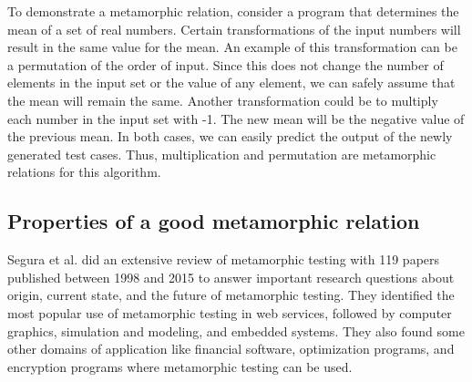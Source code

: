 To demonstrate a metamorphic relation, consider a program that determines the mean of a set of real numbers. Certain transformations of the input numbers will result in the same value for the mean. An example of this transformation can be a permutation of the order of input. Since this does not change the number of elements in the input set or the value of any element, we can safely assume that the mean will remain the same. Another transformation could be to multiply each number in the input set with -1. The new mean will be the negative value of the previous mean. In both cases, we can easily predict the output of the newly generated test cases. Thus, multiplication and permutation are metamorphic relations for this algorithm.

\subsection{Properties of a good metamorphic relation}
Segura et al. \cite{Segura2016} did an extensive review of metamorphic testing with 119 papers published between 1998 and 2015 to answer important research questions about origin, current state, and the future of metamorphic testing. They identified the most popular use of metamorphic testing in web services, followed by computer graphics, simulation and modeling, and embedded systems. They also found some other domains of application like financial software, optimization programs, and encryption programs where metamorphic testing can be used.
 
